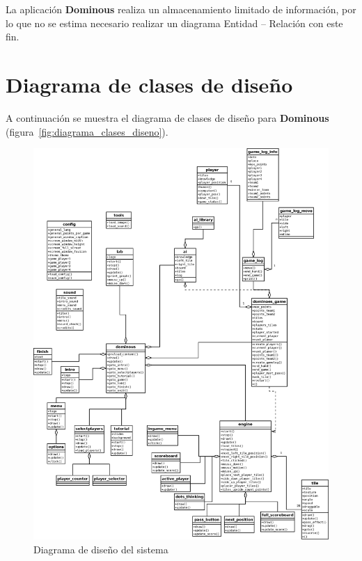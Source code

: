 La aplicación \textbf{Dominous} realiza un almacenamiento limitado de información, por lo que no se estima necesario
realizar un diagrama Entidad -- Relación con este fin.

\section{Diagrama de clases de diseño}

A continuación se muestra el diagrama de clases de diseño para \textbf{Dominous} (figura~\vref{fig:diagrama_clases_diseno}).

\begin{figure}[H]
  \begin{center}
    \includegraphics[width=1\textwidth]{diagrama_clases_diseno.png}
  \end{center}
  \caption{Diagrama de diseño del sistema}
  \label{fig:diagrama_clases_diseno}
\end{figure}


